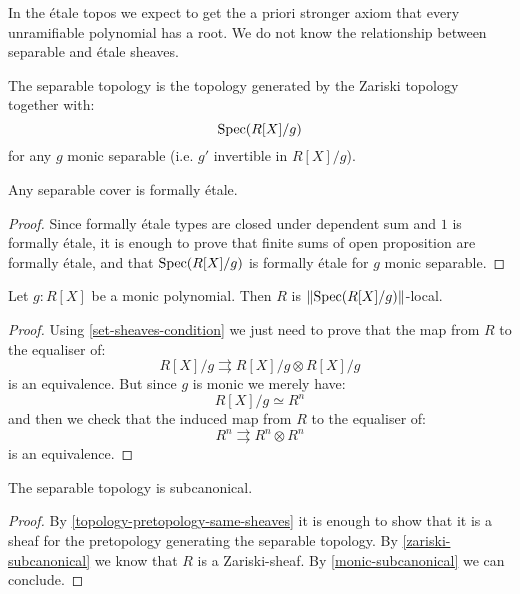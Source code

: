 \begin{remark}
In the étale topos we expect to get the a priori stronger axiom that every unramifiable polynomial has a root. We do not know the relationship between separable and étale sheaves.
\end{remark}

\begin{definition}
The separable topology is the topology generated by the Zariski topology together with:
\[\operatorname{Spec}(R[X]/g)\]
for any $g$ monic separable (i.e. $g'$ invertible in $R[X]/g$).
\end{definition}

\begin{lemma}\label{separable-included-etale}
Any separable cover is formally étale.
\end{lemma}

\begin{proof}
Since formally étale types are closed under dependent sum and $1$ is formally étale, it is enough to prove that finite sums of open proposition are formally étale, and that $\operatorname{Spec}(R[X]/g)$ is formally étale for $g$ monic separable.
\end{proof}

\begin{lemma}\label{monic-subcanonical}
Let $g:R[X]$ be a monic polynomial. Then $R$ is $\lVert \operatorname{Spec}(R[X]/g) \rVert$-local.
\end{lemma}

\begin{proof}
Using \cref{set-sheaves-condition} we just need to prove that the map from $R$ to the equaliser of:
\[R[X]/g \rightrightarrows R[X]/g \otimes R[X]/g\]
is an equivalence. But since $g$ is monic we merely have:
\[R[X]/g \simeq R^n\]
and then we check that the induced map from $R$ to the equaliser of:
\[R^n \rightrightarrows R^n\otimes R^n\]
is an equivalence.
\end{proof}

\begin{lemma}
The separable topology is subcanonical.
\end{lemma}

\begin{proof}
By \cref{topology-pretopology-same-sheaves} it is enough to show that it is a sheaf for the pretopology generating the separable topology. By \cref{zariski-subcanonical} we know that $R$ is a Zariski-sheaf. By \cref{monic-subcanonical} we can conclude. 
\end{proof}

